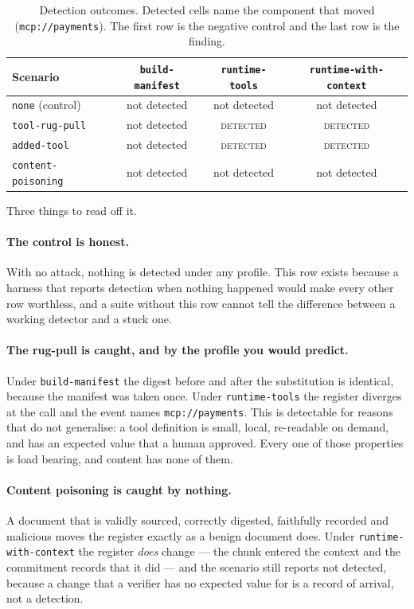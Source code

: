 \documentclass[11pt]{article}
\begin{document}
\begin{table}[htbp]
\centering
\small
\begin{tabular}{@{}lccc@{}}
\toprule
\textbf{Scenario} & \texttt{build-manifest} & \texttt{runtime-tools} &
\texttt{runtime-with-context} \\
\midrule
\texttt{none} (control) & not detected & not detected & not detected \\
\texttt{tool-rug-pull} & not detected &
\cellcolor{aailimetint}\textsc{detected} &
\cellcolor{aailimetint}\textsc{detected} \\
\texttt{added-tool} & not detected &
\cellcolor{aailimetint}\textsc{detected} &
\cellcolor{aailimetint}\textsc{detected} \\
\texttt{content-poisoning} & not detected & not detected & not detected \\
\bottomrule
\end{tabular}
\caption{Detection outcomes. Detected cells name the component that moved
(\texttt{mcp://payments}). The first row is the negative control and the last
row is the finding.}
\label{tab:detect}
\end{table}

Three things to read off it.

\paragraph{The control is honest.} With no attack, nothing is detected under
any profile. This row exists because a harness that reports detection when
nothing happened would make every other row worthless, and a suite without
this row cannot tell the difference between a working detector and a stuck
one.

\paragraph{The rug-pull is caught, and by the profile you would predict.}
Under \texttt{build-manifest} the digest before and after the substitution is
identical, because the manifest was taken once. Under \texttt{runtime-tools}
the register diverges at the call and the event names
\texttt{mcp://payments}. This is detectable for reasons that do not
generalise: a tool definition is small, local, re-readable on demand, and has
an expected value that a human approved. Every one of those properties is load
bearing, and content has none of them.

\paragraph{Content poisoning is caught by nothing.} A document that is validly
sourced, correctly digested, faithfully recorded and malicious moves the
register exactly as a benign document does. Under
\texttt{runtime-with-context} the register \emph{does} change --- the chunk
entered the context and the commitment records that it did --- and the
scenario still reports not detected, because a change that a verifier has no
expected value for is a record of arrival, not a detection.
\end{document}
